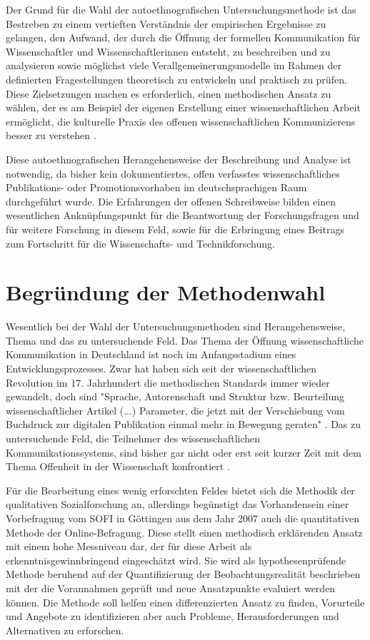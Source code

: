 {Der Grund für die Wahl der autoethnografischen Untersuchungsmethode ist das Bestreben zu einem vertieften Verständnis der empirischen Ergebnisse zu gelangen, den Aufwand, der durch die Öffnung der formellen Kommunikation für Wissenschaftler und Wissenschaftlerinnen entsteht, zu beschreiben und zu analysieren sowie möglichst viele Verallgemeinerungsmodelle im Rahmen der definierten Fragestellungen theoretisch zu entwickeln und praktisch zu prüfen. Diese Zielsetzungen machen es erforderlich, einen methodischen Ansatz zu wählen, der es am Beispiel der eigenen Erstellung einer wissenschaftlichen Arbeit ermöglicht, die kulturelle Praxis des offenen wissenschaftlichen Kommunizierens besser zu verstehen \cite{maso_2001_phenomenology}.

Diese autoethnografischen Herangehensweise der Beschreibung und Analyse ist notwendig, da bisher kein dokumentiertes, offen verfasstes wissenschaftliches Publikations- oder Promotionsvorhaben im deutschsprachigen Raum durchgeführt wurde. Die Erfahrungen der offenen Schreibweise bilden einen wesentlichen Anknüpfungspunkt für die Beantwortung der Forschungsfragen und für weitere Forschung in diesem Feld, sowie für die Erbringung eines Beitrags zum Fortschritt für die Wissenschafts- und Technikforschung.

\section{Begründung der Methodenwahl}

Wesentlich bei der Wahl der Untersuchungsmethoden sind Herangehensweise, Thema und das zu untersuchende Feld. Das Thema der Öffnung wissenschaftliche Kommunikation in Deutschland ist noch im Anfangsstadium eines Entwicklungsprozesses. Zwar hat haben sich seit der wissenschaftlichen Revolution im 17. Jahrhundert die methodischen Standards immer wieder gewandelt, doch sind "Sprache, Autorenschaft und Struktur bzw. Beurteilung wissenschaftlicher Artikel (...) Parameter, die jetzt mit der Verschiebung vom Buchdruck zur digitalen Publikation einmal mehr in Bewegung geraten" \cite{hagner_2015_sache_buches}. Das zu untersuchende Feld, die Teilnehmer des wissenschaftlichen Kommunikationssystems, sind bisher gar nicht oder erst seit kurzer Zeit mit dem Thema Offenheit in der Wissenschaft konfrontiert \cite{hagner_2015_sache_buches}.

Für die Bearbeitung eines wenig erforschten Feldes bietet sich die Methodik der qualitativen Sozialforschung an, allerdings begünstigt das Vorhandensein einer Vorbefragung vom SOFI in Göttingen aus dem Jahr 2007 auch die quantitativen Methode der Online-Befragung. Diese stellt einen methodisch erklärenden Ansatz mit einem hohe Messniveau dar, der für diese Arbeit als erkenntnisgewinnbringend eingeschätzt wird. Sie wird als hypothesenprüfende Methode beruhend auf der Quantifizierung der Beobachtungsrealität beschrieben \cite{bortz_Doering_2006_Methoden} mit der die Vorannahmen geprüft und neue Ansatzpunkte evaluiert werden können. Die Methode soll helfen einen differenzierten Ansatz zu finden, Vorurteile und Angebote zu identifizieren aber auch Probleme, Herausforderungen und Alternativen zu erforschen.

}
